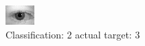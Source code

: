 \begin{figure}[h!]
\begin{center}
\includegraphics[width=0.60\columnwidth]{figures/ID551_class_2_target_3.png}
\end{center}
\caption{ Classification: 2 actual target: 3}
\label{fig:ID551_class_2_target_3}
\end{figure}
